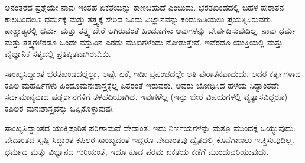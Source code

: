 ಅನಂತರದ ಪ್ರಶ್ನೆಯೇ ನಾವು ಇಂತಹ ಏಕತೆಯನ್ನು ಕಾಣಬಹುದೆ ಎಂಬುದು. ಭರತಖಂಡದಲ್ಲಿ ಬಹಳ ಪುರಾತನ ಕಾಲದಿಂದಲೂ ಧರ್ಮಕ್ಕೆ ಮತ್ತು ತತ್ತ್ವಕ್ಕೆ ಸೇರಿದ ಒಂದು ವಿಜ್ಞಾನವನ್ನು ಕಂಡುಹಿಡಿಯಲು ಪ್ರಯತ್ನಿಸಿರುವರು. ಪಾಶ್ಚಾತ್ಯರಲ್ಲಿ ಧರ್ಮ ಮತ್ತು ತತ್ತ್ವ ಬೇರೆ ಆಗಿರುವಂತೆ ಹಿಂದೂಗಳು ಅವುಗಳನ್ನು ಬೇರ್ಪಡಿಸುವುದಿಲ್ಲ. ನಾವು ಧರ್ಮ ಮತ್ತು ತತ್ತ್ವಗಳೆರಡೂ ಒಂದೇ ವಸ್ತುವಿನ ಎರಡು ಮುಖಗಳೆಂದು ನೋಡುತ್ತೇವೆ. ಇವೆರಡೂ ಯುಕ್ತಿಯಲ್ಲಿ ಮತ್ತು ವೈಜ್ಞಾನಿಕ ಸತ್ಯದಲ್ಲಿ ಪ್ರತಿಷ್ಠಿತವಾಗಿರಬೇಕು.

ಸಾಂಖ್ಯಸಿದ್ದಾಂತ ಭರತಖಂಡದಲ್ಲೆಲ್ಲಾ, ಅಷ್ಟೇ ಏಕೆ, ಇಡೀ ಪ್ರಪಂಚದಲ್ಲೇ ಅತಿ ಪುರಾತನವಾದುದು. ಅದರ ಕರ್ತೃಗಳಾದ ಕಪಿಲ ಮಹರ್ಷಿಗಳು ಹಿಂದೂ\break ಮನಃಶಾಸ್ತ್ರಕ್ಕೆಲ್ಲ ಪಿತರಂತೆ ಇರುವರು. ಅವರು ಬೋಧಿಸಿದ ಹಳೆಯ ಸಿದ್ದಾಂತವೇ ಸರ್ವಮಾನ್ಯವಾದ ಷಡ್ದರ್ಶನಗಳಿಗೆ ತಳಹದಿಯಾಗಿದೆ. ಇವುಗಳೆಲ್ಲ (ಇನ್ನು ಬೇರೆ ವಿಷಯಗಳಲ್ಲಿ ವ್ಯತ್ಯಾಸವಿದ್ದರೂ) ಕಪಿಲರ ಮನಃಶಾಸ್ತ್ರವನ್ನು ಒಪ್ಪಿಕೊಳ್ಳುವುವು.

ಸಾಂಖ್ಯಸಿದ್ಧಾಂತದ ಯುಕ್ತಿಪೂರಿತ ಪರಿಣಾಮವೆ ವೇದಾಂತ. ಇದು ನಿರ್ಣಯಗಳನ್ನು ಮತ್ತೂ ಮುಂದಕ್ಕೆ ಒಯ್ಯುವುದು. ವೇದಾಂತದ ಸೃಷ್ಟಿ-ಸಿದ್ಧಾಂತ  ಕಪಿಲರ ಸಾಂಖ್ಯದಂತೆ ಇದ್ದರೂ ವೇದಾಂತವು ದ್ವೈತದಲ್ಲಿ ಕೊನೆಗಾಣಲು ಇಚ್ಚಿಸುವುದಿಲ್ಲ. ಧರ್ಮದ ಮತ್ತು ವಿಜ್ಞಾನದ ಗುರಿಯಂತೆ, ಇದೂ ಕೂಡ ಪರಮ ಏಕತೆಯ ಕಡೆಗೆ ಮುಂದುವರಿಯುವುದು.

